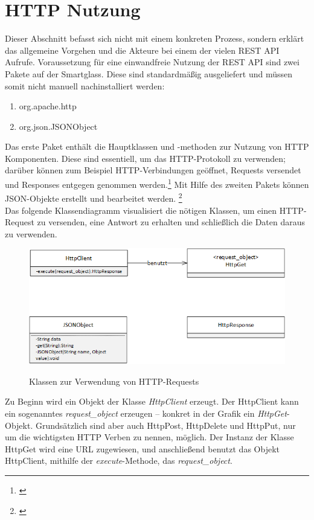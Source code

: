 \section{HTTP Nutzung}
\label{sec:httpnutzung}
Dieser Abschnitt befasst sich nicht mit einem konkreten Prozess, sondern erklärt das allgemeine Vorgehen und die Akteure bei einem der vielen REST API Aufrufe. Voraussetzung für eine einwandfreie Nutzung der REST API sind zwei Pakete auf der Smartglass. Diese sind standardmäßig ausgeliefert und müssen somit nicht manuell nachinstalliert werden:
\begin{enumerate}
	\item org.apache.http
	\item org.json.JSONObject
\end{enumerate}
Das erste Paket enthält die Hauptklassen und -methoden zur Nutzung von HTTP Komponenten. Diese sind essentiell, um das HTTP-Protokoll zu verwenden; darüber können zum Beispiel HTTP-Verbindungen geöffnet, Requests versendet und Responses entgegen genommen werden.\footnote{\citep{http}} Mit Hilfe des zweiten Pakets können JSON-Objekte erstellt und bearbeitet werden. \footnote{\citep{json}}\\

Das folgende Klassendiagramm visualisiert die nötigen Klassen, um einen HTTP-Request zu versenden, eine Antwort zu erhalten und schließlich die Daten daraus zu verwenden.

\begin{figure}[H]
	\centering
	{\includegraphics[scale=0.7]{Bilder/Abbildungen/http_request_klassendiagramm.png}}
	\caption{Klassen zur Verwendung von HTTP-Requests}
	\label{fig:http_klassen}
\end{figure}

Zu Beginn wird ein Objekt der Klasse \emph{HttpClient} erzeugt. Der HttpClient kann ein sogenanntes \emph{request\_object} erzeugen -- konkret in der Grafik ein \emph{HttpGet}-Objekt. Grundsätzlich sind aber auch HttpPost, HttpDelete und HttpPut, nur um die wichtigsten HTTP Verben zu nennen, möglich. Der Instanz der Klasse HttpGet wird eine URL zugewiesen, und anschließend benutzt das Objekt HttpClient, mithilfe der \emph{execute}-Methode, das \emph{request\_object}.\\

